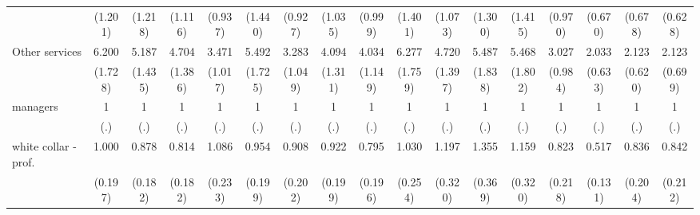{\begin{tabular}{l*{16}{c}}
                    &     (1.201)         &     (1.218)         &     (1.116)         &     (0.937)         &     (1.440)         &     (0.927)         &     (1.035)         &     (0.999)         &     (1.401)         &     (1.073)         &     (1.300)         &     (1.415)         &     (0.970)         &     (0.670)         &     (0.678)         &     (0.628)         \\
[1em]
Other services      &       6.200\sym{***}&       5.187\sym{***}&       4.704\sym{***}&       3.471\sym{***}&       5.492\sym{***}&       3.283\sym{***}&       4.094\sym{***}&       4.034\sym{***}&       6.277\sym{***}&       4.720\sym{***}&       5.487\sym{***}&       5.468\sym{***}&       3.027\sym{***}&       2.033\sym{*}  &       2.123\sym{**} &       2.123\sym{*}  \\
                    &     (1.728)         &     (1.435)         &     (1.386)         &     (1.017)         &     (1.725)         &     (1.049)         &     (1.311)         &     (1.149)         &     (1.759)         &     (1.397)         &     (1.838)         &     (1.802)         &     (0.984)         &     (0.633)         &     (0.620)         &     (0.699)         \\
[1em]
managers            &           1         &           1         &           1         &           1         &           1         &           1         &           1         &           1         &           1         &           1         &           1         &           1         &           1         &           1         &           1         &           1         \\
                    &         (.)         &         (.)         &         (.)         &         (.)         &         (.)         &         (.)         &         (.)         &         (.)         &         (.)         &         (.)         &         (.)         &         (.)         &         (.)         &         (.)         &         (.)         &         (.)         \\
[1em]
white collar - prof.&       1.000         &       0.878         &       0.814         &       1.086         &       0.954         &       0.908         &       0.922         &       0.795         &       1.030         &       1.197         &       1.355         &       1.159         &       0.823         &       0.517\sym{**} &       0.836         &       0.842         \\
                    &     (0.197)         &     (0.182)         &     (0.182)         &     (0.233)         &     (0.199)         &     (0.202)         &     (0.199)         &     (0.196)         &     (0.254)         &     (0.320)         &     (0.369)         &     (0.320)         &     (0.218)         &     (0.131)         &     (0.204)         &     (0.212)         \\

\end{tabular}}
